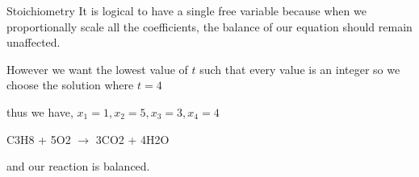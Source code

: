\documentclass{beamer}
\begin{document}
\begin{frame}{Stoichiometry}
    It is logical to have a single free variable because when we proportionally scale all the coefficients, the balance of our equation should remain unaffected.

    However we want the lowest value of $t$ such that every value is an integer so we choose the solution where $t=4$

thus we have, $x_1 = 1, x_2=5, x_3=3,x_4=4$

\begin{center}
    C3H8 + 5O2 $\xrightarrow{}$ 3CO2 + 4H2O \\
\end{center}

and our reaction is balanced.

\end{frame}
\end{document}
